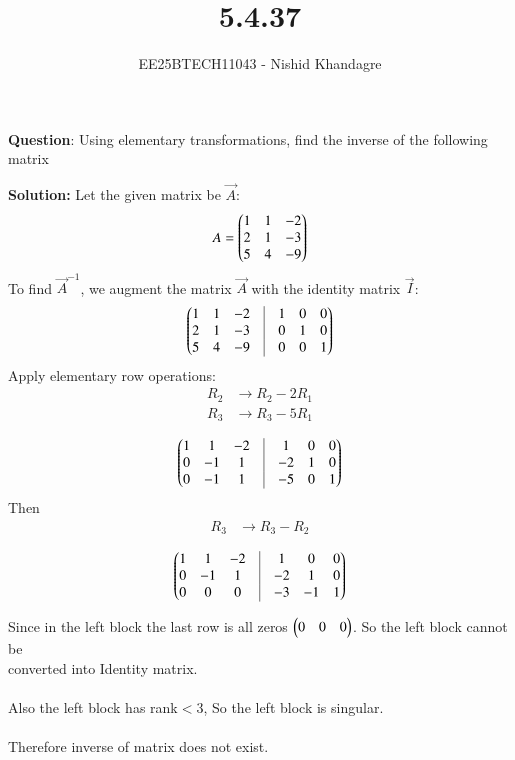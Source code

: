 \documentclass[journal]{IEEEtran}
\title{5.4.37}
\author{EE25BTECH11043 - Nishid Khandagre}
\begin{document}
\maketitle

\renewcommand{\thefigure}{\theenumi}
\renewcommand{\thetable}{\theenumi}


\textbf{Question}:
Using elementary transformations, find the inverse of the following matrix


\textbf{Solution: }
Let the given matrix be $\vec{A}$:
\begin{align}
A = \begin{pmatrix}
1 & 1 & -2 \\
2 & 1 & -3 \\
5 & 4 & -9\end{pmatrix}
\end{align}
To find $\vec{A}^{-1}$, we augment the matrix $\vec{A}$ with the identity matrix $\vec{I}$:
\begin{align}
\myvec{
        1 & 1 & -2 & \vrule & 1 & 0 & 0 \\
        2 & 1 & -3 & \vrule & 0 & 1 & 0 \\
        5 & 4 & -9 & \vrule & 0 & 0 & 1
    }
\end{align}
Apply elementary row operations:
\begin{align*}
R_2 &\rightarrow R_2 - 2R_1 \\
R_3 &\rightarrow R_3 - 5R_1 \\
\end{align*}
\begin{align}
\myvec{
1 & 1 & -2 & \vrule & 1 & 0 & 0 \\
0 & -1 & 1 & \vrule & -2 & 1 & 0 \\
0 & -1 & 1 & \vrule & -5 & 0 & 1
}
\end{align}
Then
\begin{align*}
R_3 &\rightarrow R_3 - R_2 \\
\end{align*}
\begin{align}
\myvec{
1 & 1 & -2 & \vrule & 1 & 0 & 0 \\
0 & -1 & 1 & \vrule & -2 & 1 & 0 \\
0 & 0 & 0 &  \vrule & -3 & -1 & 1
}
\end{align}

Since in the left block the last row is all zeros $\begin{pmatrix}0 & 0 & 0\end{pmatrix}$. So the left block cannot be\\ converted into Identity matrix.\\\\
Also the left block has rank$<$3, So the left block is singular.\\ \\
Therefore inverse of matrix does not exist.
\end{document}
